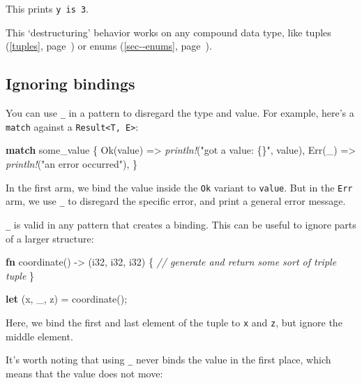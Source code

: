 \documentclass[a4paper,]{book}
\renewcommand*{\hyperlink}[2]{%
 #2 (\autoref{#1}, page~\pageref{#1})}
\newenvironment{Shaded}{\begin{snugshade}}{\end{snugshade}}
\newcommand{\KeywordTok}[1]{\textcolor[rgb]{0.13,0.29,0.53}{\textbf{{#1}}}}
\newcommand{\DataTypeTok}[1]{\textcolor[rgb]{0.13,0.29,0.53}{{#1}}}
\newcommand{\ConstantTok}[1]{\textcolor[rgb]{0.00,0.00,0.00}{{#1}}}
\newcommand{\StringTok}[1]{\textcolor[rgb]{0.31,0.60,0.02}{{#1}}}
\newcommand{\CommentTok}[1]{\textcolor[rgb]{0.56,0.35,0.01}{\textit{{#1}}}}
\newcommand{\PreprocessorTok}[1]{\textcolor[rgb]{0.56,0.35,0.01}{\textit{{#1}}}}
\newcommand{\NormalTok}[1]{{#1}}
\begin{document}
This prints \texttt{y\ is\ 3}.

This `destructuring' behavior works on any compound data type, like
\protect\hyperlink{tuples}{tuples} or
\protect\hyperlink{sec--enums}{enums}.

\subsection{Ignoring bindings}\label{ignoring-bindings}

You can use \texttt{\_} in a pattern to disregard the type and value.
For example, here's a \texttt{match} against a
\texttt{Result\textless{}T,\ E\textgreater{}}:

\begin{Shaded}
\begin{Highlighting}[]
\KeywordTok{match} \NormalTok{some_value \{}
    \ConstantTok{Ok}\NormalTok{(value) => }\PreprocessorTok{println!}\NormalTok{(}\StringTok{"got a value: \{\}"}\NormalTok{, value),}
    \ConstantTok{Err}\NormalTok{(_) => }\PreprocessorTok{println!}\NormalTok{(}\StringTok{"an error occurred"}\NormalTok{),}
\NormalTok{\}}
\end{Highlighting}
\end{Shaded}

In the first arm, we bind the value inside the \texttt{Ok} variant to
\texttt{value}. But in the \texttt{Err} arm, we use \texttt{\_} to
disregard the specific error, and print a general error message.

\texttt{\_} is valid in any pattern that creates a binding. This can be
useful to ignore parts of a larger structure:

\begin{Shaded}
\begin{Highlighting}[]
\KeywordTok{fn} \NormalTok{coordinate() -> (}\DataTypeTok{i32}\NormalTok{, }\DataTypeTok{i32}\NormalTok{, }\DataTypeTok{i32}\NormalTok{) \{}
    \CommentTok{// generate and return some sort of triple tuple}
\NormalTok{\}}

\KeywordTok{let} \NormalTok{(x, _, z) = coordinate();}
\end{Highlighting}
\end{Shaded}

Here, we bind the first and last element of the tuple to \texttt{x} and
\texttt{z}, but ignore the middle element.

It's worth noting that using \texttt{\_} never binds the value in the
first place, which means that the value does not move:
\end{document}
